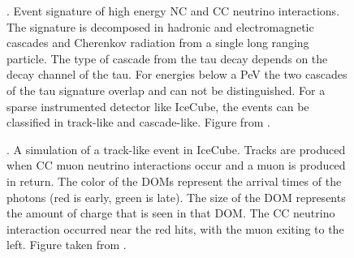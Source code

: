 \begin{figure}
    \caption{. Event signature of high energy NC and CC neutrino interactions. The signature is decomposed in hadronic and electromagnetic cascades and Cherenkov radiation from a single long ranging particle. The type of cascade from the tau decay depends on the decay channel of the tau. For energies below a PeV the two cascades of the tau signature overlap and can not be distinguished. For a sparse instrumented detector like IceCube, the events can be classified in track-like and cascade-like. Figure from \cite{rene_thesis_nutracks}.}
    \label{fig:}
\end{figure}

\begin{figure}
    \caption{. A simulation of a track-like event in IceCube. Tracks are produced when CC muon neutrino interactions occur and a muon is produced in return. The color of the DOMs represent the arrival times of the photons (red is early, green is late). The size of the DOM represents the amount of charge that is seen in that DOM. The CC neutrino interaction occurred near the red hits, with the muon exiting to the left. Figure taken from \cite{IC3_masterclass}.}
    \label{fig:ic3_track}
\end{figure}


